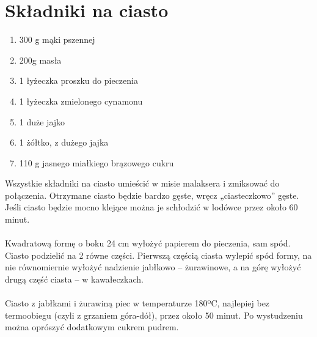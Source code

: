 \documentclass[12pt, letterpaper, titlepage]{article}
\begin{document}
\section*{Składniki na ciasto}
\begin{enumerate}[•]
\item 300 g mąki pszennej
\item 200g masła
\item 1 łyżeczka proszku do pieczenia
\item 1 łyżeczka zmielonego cynamonu
\item 1 duże jajko
\item 1 żółtko, z dużego jajka
\item 110 g jasnego miałkiego brązowego cukru
\end{enumerate}
Wszystkie składniki na ciasto umieścić w misie malaksera i zmiksować do połączenia. Otrzymane ciasto będzie bardzo gęste, wręcz „ciasteczkowo” gęste. Jeśli ciasto będzie mocno klejące można je schłodzić w lodówce przez około 60 minut.\\
\\
Kwadratową formę o boku 24 cm wyłożyć papierem do pieczenia, sam spód. Ciasto podzielić na 2 równe części. Pierwszą częścią ciasta wylepić spód formy, na nie równomiernie wyłożyć nadzienie jabłkowo – żurawinowe, a na górę wyłożyć drugą część ciasta – w kawałeczkach.\\
\\
Ciasto z jabłkami i żurawiną piec w temperaturze 180ºC, najlepiej bez termoobiegu (czyli z grzaniem góra-dół), przez około 50 minut. Po wystudzeniu można oprószyć dodatkowym cukrem pudrem.
\\
\end{document}
